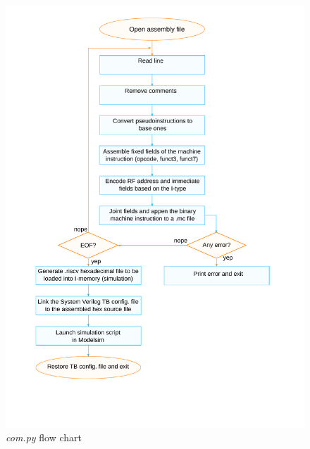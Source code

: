 \begin{figure}[hbtp]
   \centering
   \includegraphics[scale=.7]{../common/ref/schematic/compy.pdf}
   \caption{\textit{com.py} flow chart}
   \label{fig:compy}
\end{figure}